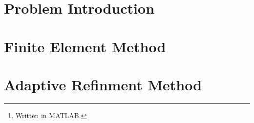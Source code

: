 \documentclass[12pt]{article}
\title{\reporttitle}
\author{Andrea Di Antonio, 858798 \\ \hyperlink{mailto:a.diantonio1@campus.unimib.it}{a.diantonio1@campus.unimib.it}}
\date{Exam session of July 27, 2023 \\ Academic Year 2022-23}
\newcommand{\reporttitle}{Adaptive 1D 1st-order Lagrange FEM}
\begin{document}
	\maketitle
	\thispagestyle{fancy}

	\begin{abstract}
		\begin{center}
            Report for the course \textit{Metodi Numerici per Equazioni alle Derivate Parziali} on the definition and costruction of an \textit{\reporttitle}\footnote{Written in MATLAB.} and a subsequent analysis which includes a comparison against a more naive approach by considering a sequence of uniformly refined meshes.
        \end{center}
	\end{abstract}

    \newpage
    \tableofcontents

    \newpage
    \section{Problem Introduction}
    

    \newpage
    \section{Finite Element Method}
    

    \newpage
    \section{Adaptive Refinment Method}
\end{document}
